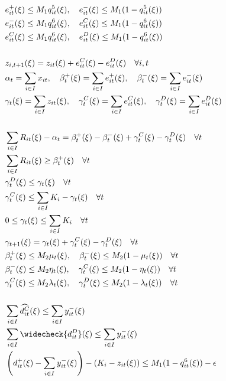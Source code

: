\documentclass[10pt]{article}
\begin{document}
\begin{subequations}
\begin{align*}
    &e^{+}_{it}(\xi) \leq M_1 q^5_{it}(\xi), \quad e^{-}_{it}(\xi) \leq M_1 (1 - q^5_{it}(\xi)) &\\
    &e^{-}_{it}(\xi) \leq M_1 q^6_{it}(\xi), \quad e^{C}_{it}(\xi) \leq M_1 (1 - q^6_{it}(\xi)) &\\
    &e^{C}_{it}(\xi) \leq M_1 q^6_{it}(\xi), \quad e^{D}_{it}(\xi) \leq M_1 (1 - q^6_{it}(\xi)) &\\
    &&\\
    &z_{i,t+1}(\xi) = z_{it}(\xi) + e^C_{it}(\xi) - e^D_{it}(\xi) \quad \forall i, t &\\
    &\alpha_t = \sum_{i\in I}x_{it}, \quad \beta_t^+(\xi) = \sum_{i\in I}e^+_{it}(\xi), \quad \beta_t^-(\xi) = \sum_{i\in I}e^-_{it}(\xi)&\\
    &\gamma_t(\xi) = \sum_{i\in I}z_{it}(\xi), \quad \gamma^C_t(\xi) = \sum_{i\in I}e^C_{it}(\xi), \quad \gamma^D_t(\xi) = \sum_{i\in I}e^D_{it}(\xi)&\\
    &&\\
    & \sum_{i \in I} R_{it}(\xi) - \alpha_t = \beta^+_t(\xi) - \beta^-_t(\xi) + \gamma^C_t(\xi) - \gamma^D_t(\xi) \quad \forall t &\\
    &\sum_{i\in I}R_{it}(\xi) \geq \beta_{t}^{+}(\xi) \quad \forall t &\\ 
    &\gamma^D_t(\xi) \le \gamma_{t}(\xi) \quad \forall t &\\
    &\gamma^C_t(\xi) \le \sum_{i \in I}K_i - \gamma_{t}(\xi) \quad \forall t &\\
    &0 \leq \gamma_t(\xi) \leq \sum_{i \in I} K_i \quad \forall t &\\
    &\gamma_{t+1}(\xi) = \gamma_{t}(\xi) + \gamma^C_t(\xi) - \gamma^D_t(\xi) \quad \forall t &\\
    &\beta^+_t(\xi) \le M_2 \mu_t(\xi), \quad \beta^-_t(\xi) \le M_2 (1 - \mu_t(\xi)) \quad \forall t &\\ 
    &\beta^-_t(\xi) \le M_2 \eta_t(\xi), \quad \gamma^C_t(\xi) \le M_2 (1 - \eta_t(\xi))\quad \forall t &\\
    &\gamma^C_t(\xi) \le M_2\lambda_t(\xi), \quad \gamma^D_t(\xi) \le M_2(1 - \lambda_t(\xi)) \quad \forall t &\\
    &&\\
    &\sum_{i \in I}\widehat{d^{C}_{it}}(\xi) \leq \sum_{i \in I}y^-_{it}(\xi)&\\
    &\sum_{i \in I}\widecheck{d^{D}_{it}}(\xi) \leq \sum_{i \in I}y^-_{it}(\xi)&\\
    &\left(d^+_{it}(\xi) - \sum_{i \in I}y^-_{it}(\xi) \right) - \left(K_i - z_{it}(\xi)\right) \leq M_1(1-q^6_{it}(\xi))-\epsilon &\\

\end{align*}
\end{subequations}
\end{document}
